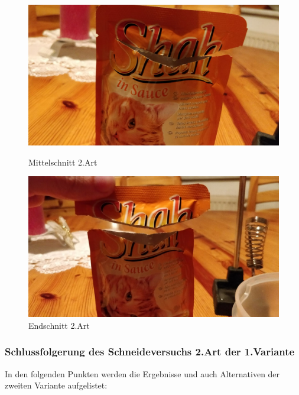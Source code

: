 \begin{figure}[H]
   \begin{minipage}[hbt]{.4\linewidth} %
      \includegraphics[width=\linewidth]{Bilder/Schneideversuch_2.Art/Mittelschnitt}
      \caption{Mittelschnitt 2.Art}
      \label{Nach 6 Schnitten}
   \end{minipage}
   \hspace{.2\linewidth}%
   \begin{minipage}[hbt]{.4\linewidth} %
      \includegraphics[width=\linewidth]{Bilder/Schneideversuch_2.Art/Endschnitt}
      \caption{Endschnitt 2.Art}
      \label{Nach 9 Schnitten}
   \end{minipage}
\end{figure}

\subsubsection{Schlussfolgerung des Schneideversuchs 2.Art der 1.Variante }

In den folgenden Punkten werden die Ergebnisse und auch Alternativen der zweiten Variante aufgelistet:

